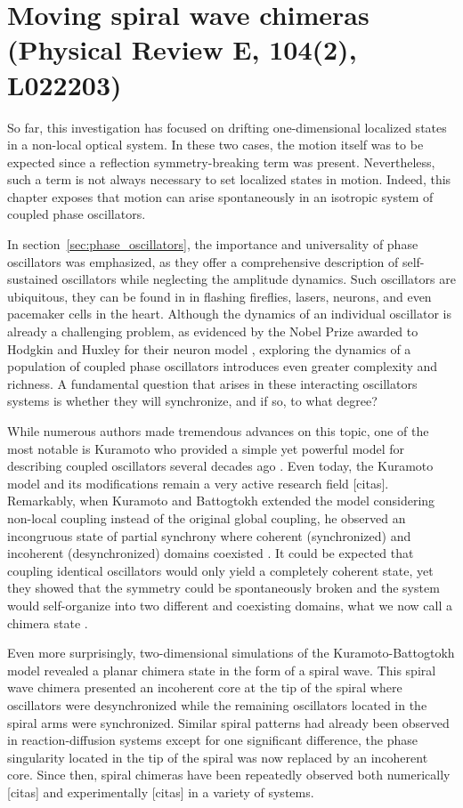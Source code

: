 \chapter{Moving spiral wave chimeras (Physical Review E, 104(2), L022203)}

So far, this investigation has focused on drifting one-dimensional localized states in a non-local optical system. 
In these two cases, the motion itself was to be expected since a reflection
symmetry-breaking term was present. Nevertheless, such a term is not always
necessary to set localized states in motion. Indeed, this chapter exposes that motion can arise spontaneously
in an isotropic system of coupled phase oscillators.

In section~\ref{sec:phase_oscillators}, the importance
and universality of phase oscillators was emphasized, as they offer a comprehensive
description of self-sustained oscillators while neglecting the amplitude 
dynamics. Such oscillators are ubiquitous, they can be found in
in flashing fireflies, lasers, neurons, and even pacemaker cells in the heart.
Although the dynamics of an individual oscillator is already a challenging problem, as evidenced
by the Nobel Prize awarded to Hodgkin and Huxley for their neuron model
\cite{hodgkin1952quantitative},
exploring the dynamics of a population of coupled phase oscillators
introduces even greater complexity and richness. A fundamental question that
arises in these interacting oscillators systems is whether they will synchronize, 
and if so, to what degree?

While numerous authors made tremendous advances on this topic, one of the
most notable is Kuramoto who provided a simple yet powerful model 
for describing coupled oscillators several decades ago \cite{kuramoto1975model}. Even today, the Kuramoto
model and its modifications remain a very active research field [citas].
Remarkably, when Kuramoto and Battogtokh extended the model considering non-local coupling instead
of the original global coupling, he observed an incongruous state
of partial synchrony where coherent (synchronized) and incoherent (desynchronized) domains coexisted \cite{kuramoto2002coexistence}.
It could be expected that coupling identical oscillators would only yield a completely coherent
state, yet they showed that the symmetry could be spontaneously broken and the system
would self-organize into two different and coexisting domains, what we now call a chimera state \cite{abrams2004chimera}.

Even more surprisingly, two-dimensional simulations of the Kuramoto-Battogtokh model
revealed a planar chimera state in the form of a spiral wave. This spiral wave chimera
presented an incoherent core at the tip of the spiral where oscillators were desynchronized
while the remaining oscillators located in the spiral arms were synchronized. Similar spiral
patterns had already been observed in reaction-diffusion systems except for one significant
difference, the phase singularity located in the tip of the spiral was now replaced by
an incoherent core. Since then, spiral chimeras have been repeatedly observed both numerically [citas] and experimentally [citas]
in a variety of systems. 

